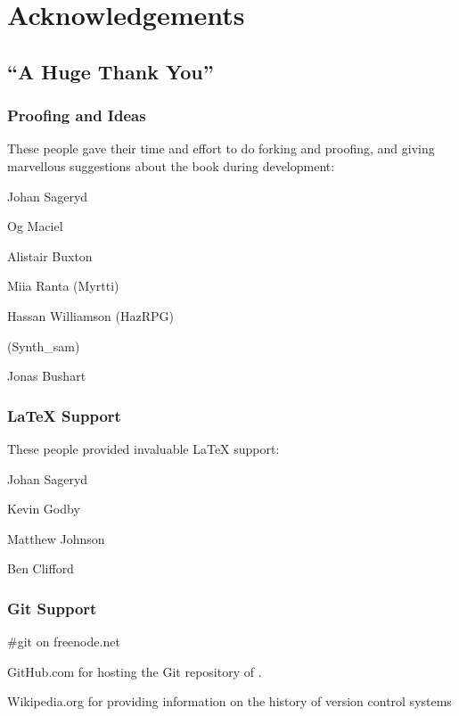 \chapter{Acknowledgements}
\section{``A Huge Thank You''}

\subsection{Proofing and Ideas}
These people gave their time and effort to do forking and proofing, and giving marvellous suggestions about the book during development:

Johan Sageryd

Og Maciel

Alistair Buxton

Miia Ranta (Myrtti)

Hassan Williamson (HazRPG)

(Synth\_sam)

Jonas Bushart

\subsection{\LaTeX{} Support}
These people provided invaluable \LaTeX{} support:

Johan Sageryd

Kevin Godby

Matthew Johnson

Ben Clifford

\subsection{Git Support}
\#git on freenode.net

GitHub.com for hosting the Git repository of \GITT.

Wikipedia.org for providing information on the history of version control systems


